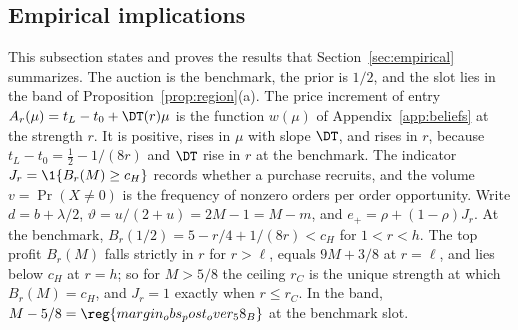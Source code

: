 \subsection{Empirical implications}\label{app:empirical}

This subsection states and proves the results that Section~\ref{sec:empirical} summarizes. The auction is the benchmark, the prior is
\(1/2\), and the slot lies in the band of Proposition~\ref{prop:region}(a). The price increment of entry
\(A_r(\mu)=t_L-t_0+\DT(r)\mu\) is the function \(w(\mu)\) of Appendix~\ref{app:beliefs} at the strength \(r\). It is
positive, rises in \(\mu\) with slope \(\DT\), and rises in \(r\), because \(t_L-t_0=\tfrac12-1/(8r)\) and \(\DT\) rise
in \(r\) at the benchmark. The indicator \(J_r=\1\{B_r(M)\ge c_H\}\) records whether a purchase recruits, and the
volume \(v=\Pr(X\ne0)\) is the frequency of nonzero orders per order opportunity. Write \(d=b+\lambda/2\), \(\vartheta=u/(2+u)=2M-1=M-m\), and \(e_+=\rho+(1-\rho)J_r\). At the
benchmark, \(B_r(1/2)=5-r/4+1/(8r)<c_H\) for \(1<r<h\). The top profit \(B_r(M)\) falls strictly in \(r\) for
\(r>\ell\), equals \(9M+3/8\) at \(r=\ell\), and lies below \(c_H\) at \(r=h\); so for \(M>5/8\) the ceiling \(r_C\) is the
unique strength at which \(B_r(M)=c_H\), and \(J_r=1\) exactly when \(r\le r_C\). In the band, \(M-5/8=\reg{margin_obs_post_over_58_B}\)
at the benchmark slot.


